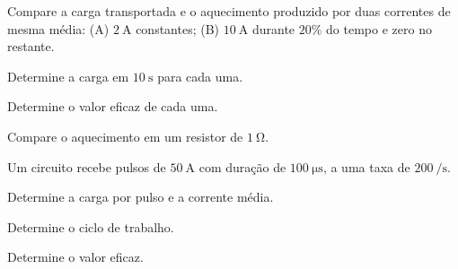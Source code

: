 \begin{questao}[3]{}

Compare a carga transportada e o aquecimento produzido por duas correntes de
mesma média: (A) $\SI{2}{\ampere}$ constantes; (B) $\SI{10}{\ampere}$ durante
$20\%$ do tempo e zero no restante.
\begin{itensq}
\item Determine a carga em $\SI{10}{\second}$ para cada uma.
\item Determine o valor eficaz de cada uma.
\item Compare o aquecimento em um resistor de $\SI{1}{\ohm}$.
\end{itensq}


\end{questao}
\begin{questao}[3]{}

Um circuito recebe pulsos de $\SI{50}{\ampere}$ com duração de
$\SI{100}{\micro\second}$, a uma taxa de $\SI{200}{\per\second}$.
\begin{itensq}
\item Determine a carga por pulso e a corrente média.
\item Determine o ciclo de trabalho.
\item Determine o valor eficaz.
\end{itensq}


\end{questao}

